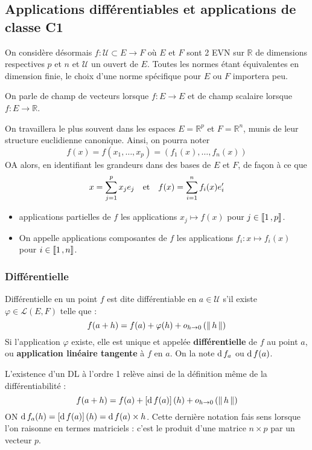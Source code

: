 \subsection{Applications différentiables et applications de classe C1}

    On considère désormais $f : \mathcal{U} \subset E \to F$ où $E$ et $F$ sont 2 EVN sur $\mathbb{R}$ de dimensions respectives $p$ et $n$ et $\mathcal{U}$ un ouvert de $E$. Toutes les normes étant équivalentes en dimension finie, le choix d’une norme spécifique pour $E$ ou $F$ importera peu. 

    On parle de champ de vecteurs lorsque $f : E \to E$ et de champ scalaire lorsque $f : E \to \mathbb{R}$.

    On travaillera le plus souvent dans les espaces $E = \mathbb{R}^p$ et $F = \mathbb{R}^n$, munis de leur structure euclidienne canonique. Ainsi, on pourra noter 
    \[ f(x) = f(x_1,\ldots,x_p) = (f_1(x), \ldots, f_n(x)) \]   
    OA alors, en identifiant les grandeurs dans des bases de $E$ et $F$, de façon à ce que 
    \[ x = \sum_{j=1}^{p} x_j e_j \quad \text{et} \quad f(x) = \sum_{i=1}^{n} f_i(x) e'_i \]   
     \begin{itemize}
        \item applications partielles de $f$ les applications $x_j \mapsto f(x)$ pour $j \in \left\llbracket 1 \, , p \right\rrbracket$.
        \item On appelle applications composantes de $f$ les applications $f_i : x \mapsto f_i(x)$ pour $i \in \left\llbracket 1 \, , n \right\rrbracket$. 
    \end{itemize}
    
    \subsubsection{Différentielle}

    \begin{defitheo}{Différentielle en un point}{}
        $f$ est dite différentiable en $a \in \mathcal{U}$ s’il existe $\varphi \in \mathcal{L}(E,F)$ telle que :
        \[ f(a+h) = f(a) + \varphi(h) + o_{h \rightarrow 0} \left(\left\lVert\,h\,\right\rVert\right) \]   
        Si l’application $\varphi$ existe, elle est unique et appelée \textbf{différentielle} de $f$ au point $a$, ou \textbf{application linéaire tangente} à $f$ en $a$. On la note $\operatorname{d} f_a$ ou $\operatorname{d} f(a)$. 
    \end{defitheo}

    L’existence d’un DL à l’ordre 1 relève ainsi de la définition même de la différentiabilité : 
    \[ f(a+ h) = f(a) + \left[\operatorname{d} f(a)\right](h) + o_{h \rightarrow 0} \left(\left\lVert\,h\,\right\rVert\right) \]   
    ON $\operatorname{d} f_a(h) = \left[\operatorname{d} f(a)\right](h) = \operatorname{d} f(a) \times h$. Cette dernière notation fais sens lorsque l’on raisonne en termes matriciels : c’est le produit d’une matrice $n \times p$ par un vecteur $p$. 

